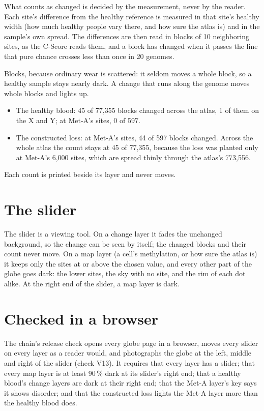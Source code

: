 What counts as changed is decided by the measurement, never by the reader. Each site's difference from the healthy reference is
measured in that site's healthy width (how much healthy people vary there, and how sure the atlas is) and in the sample's own spread.
The differences are then read in blocks of 10 neighboring sites, as the C-Score reads them, and a block has changed when it passes the
line that pure chance crosses less than once in 20 genomes.

Blocks, because ordinary wear is scattered: it seldom moves a whole block, so a healthy sample stays nearly dark. A change that runs
along the genome moves whole blocks and lights up.

\begin{itemize}
\item The healthy blood: 45 of 77{,}355 blocks changed across the atlas, 1 of them on the X and Y; at Met-A's sites, 0 of 597.
\item The constructed loss: at Met-A's sites, 44 of 597 blocks changed. Across the whole atlas the count stays at 45 of 77{,}355,
because the loss was planted only at Met-A's 6{,}000 sites, which are spread thinly through the atlas's 773{,}556.
\end{itemize}
Each count is printed beside its layer and never moves.

\section{The slider}

The slider is a viewing tool. On a change layer it fades the unchanged background, so the change can be seen by itself; the changed
blocks and their count never move. On a map layer (a cell's methylation, or how sure the atlas is) it keeps only the sites at or above
the chosen value, and every other part of the globe goes dark: the lower sites, the sky with no site, and the rim of each dot alike.
At the right end of the slider, a map layer is dark.

\section{Checked in a browser}

The chain's release check opens every globe page in a browser, moves every slider on every layer as a reader would, and photographs
the globe at the left, middle and right of the slider (check V13). It requires that every layer has a slider; that every map layer is
at least 90\,\% dark at its slider's right end; that a healthy blood's change layers are dark at their right end; that the Met-A
layer's key says it shows disorder; and that the constructed loss lights the Met-A layer more than the healthy blood does.
